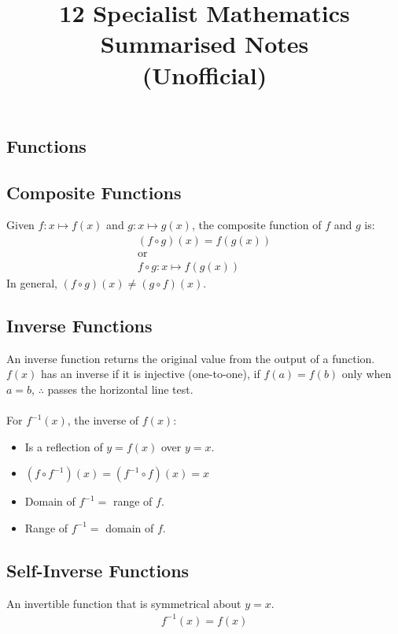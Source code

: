 \documentclass[10pt, a4paper, titlepage]{article}
\begin{document}
\title{12 Specialist Mathematics Summarised Notes \\ (Unofficial)}
\author{}
\date{}
\maketitle

\begin{multicols*}{3}

\section{Functions}
	\subsection{Composite Functions}
	Given $f:x\mapsto f(x)$ and $g:x\mapsto g(x)$, the composite function of $f$ and $g$ is:
	\begin{gather}
		(f\circ g)(x)=f(g(x))\\
		\text{or}\\
		f\circ g:x\mapsto f(g(x))
	\end{gather}
	In general, $(f\circ g)(x)\neq (g\circ f)(x)$.

	\dotfill
	\subsection{Inverse Functions}
	An inverse function returns the original value from the output of a function.\\
	$f(x)$ has an inverse if it is injective (one-to-one), if $f(a)=f(b)$ only when $a=b$, $\therefore$ passes the horizontal line test.\\\\
	For $f^{-1}(x)$, the inverse of $f(x)$:
	\begin{itemize}
		\item Is a reflection of $y=f(x)$ over $y=x$.
		\item $(f\circ f^{-1})(x)=(f^{-1}\circ f)(x)=x$
		\item Domain of $f^{-1}=$ range of $f$.
		\item Range of $f^{-1}=$ domain of $f$.
	\end{itemize}

	\dotfill
	\subsection{Self-Inverse Functions}
	An invertible function that is symmetrical about $y=x$.
	\begin{align}
		f^{-1}(x)=f(x)
	\end{align}


\end{multicols*}
\end{document}
